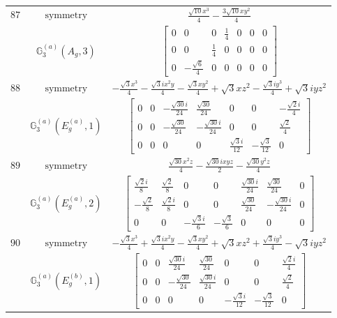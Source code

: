 \documentclass[fleqn,8pt,landscape]{jsarticle}
\begin{document}
\begin{longtable}{ccc}
$ 87 $ & $ \text{symmetry} $ & $ \frac{\sqrt{10} x^{3}}{4} - \frac{3 \sqrt{10} x y^{2}}{4} $ \\
$  $ & $ \mathbb{G}_{3}^{(a)}(A_{g},3) $ & $ \begin{bmatrix} 0 & 0 & 0 & \frac{1}{4} & 0 & 0 & 0 \\ 0 & 0 & \frac{1}{4} & 0 & 0 & 0 & 0 \\ 0 & - \frac{\sqrt{6}}{4} & 0 & 0 & 0 & 0 & 0 \end{bmatrix} $ \\ \hline
$ 88 $ & $ \text{symmetry} $ & $ - \frac{\sqrt{3} x^{3}}{4} - \frac{\sqrt{3} i x^{2} y}{4} - \frac{\sqrt{3} x y^{2}}{4} + \sqrt{3} x z^{2} - \frac{\sqrt{3} i y^{3}}{4} + \sqrt{3} i y z^{2} $ \\
$  $ & $ \mathbb{G}_{3}^{(a)}(E_{g}^{(a)},1) $ & $ \begin{bmatrix} 0 & 0 & - \frac{\sqrt{30} i}{24} & \frac{\sqrt{30}}{24} & 0 & 0 & - \frac{\sqrt{2} i}{4} \\ 0 & 0 & - \frac{\sqrt{30}}{24} & - \frac{\sqrt{30} i}{24} & 0 & 0 & \frac{\sqrt{2}}{4} \\ 0 & 0 & 0 & 0 & \frac{\sqrt{3} i}{12} & - \frac{\sqrt{3}}{12} & 0 \end{bmatrix} $ \\ \hline
$ 89 $ & $ \text{symmetry} $ & $ \frac{\sqrt{30} x^{2} z}{4} - \frac{\sqrt{30} i x y z}{2} - \frac{\sqrt{30} y^{2} z}{4} $ \\
$  $ & $ \mathbb{G}_{3}^{(a)}(E_{g}^{(a)},2) $ & $ \begin{bmatrix} \frac{\sqrt{2} i}{8} & \frac{\sqrt{2}}{8} & 0 & 0 & \frac{\sqrt{30} i}{24} & \frac{\sqrt{30}}{24} & 0 \\ - \frac{\sqrt{2}}{8} & \frac{\sqrt{2} i}{8} & 0 & 0 & \frac{\sqrt{30}}{24} & - \frac{\sqrt{30} i}{24} & 0 \\ 0 & 0 & - \frac{\sqrt{3} i}{6} & - \frac{\sqrt{3}}{6} & 0 & 0 & 0 \end{bmatrix} $ \\ \hline
$ 90 $ & $ \text{symmetry} $ & $ - \frac{\sqrt{3} x^{3}}{4} + \frac{\sqrt{3} i x^{2} y}{4} - \frac{\sqrt{3} x y^{2}}{4} + \sqrt{3} x z^{2} + \frac{\sqrt{3} i y^{3}}{4} - \sqrt{3} i y z^{2} $ \\
$  $ & $ \mathbb{G}_{3}^{(a)}(E_{g}^{(b)},1) $ & $ \begin{bmatrix} 0 & 0 & \frac{\sqrt{30} i}{24} & \frac{\sqrt{30}}{24} & 0 & 0 & \frac{\sqrt{2} i}{4} \\ 0 & 0 & - \frac{\sqrt{30}}{24} & \frac{\sqrt{30} i}{24} & 0 & 0 & \frac{\sqrt{2}}{4} \\ 0 & 0 & 0 & 0 & - \frac{\sqrt{3} i}{12} & - \frac{\sqrt{3}}{12} & 0 \end{bmatrix} $ \\ \hline

\end{longtable}
\end{document}
